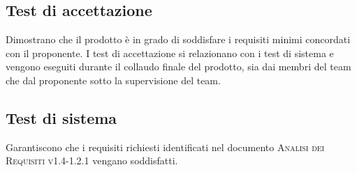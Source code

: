 \documentclass[../piano-di-qualifica.tex]{subfiles}
\begin{document}
\subsection{Test di accettazione}
\label{sub:test_di_accettazione}
Dimostrano che il prodotto è in grado di soddisfare i requisiti minimi concordati con il proponente.
I test di accettazione si relazionano con i test di sistema e vengono eseguiti durante il collaudo finale del prodotto, sia dai membri del team che dal proponente sotto la supervisione del team.

\subsection{Test di sistema}
\label{sub:test_di_sistema}
Garantiscono che i requisiti richiesti identificati nel documento \textsc{Analisi dei Requisiti v1.4-1.2.1} vengano soddisfatti.
\end{document}
